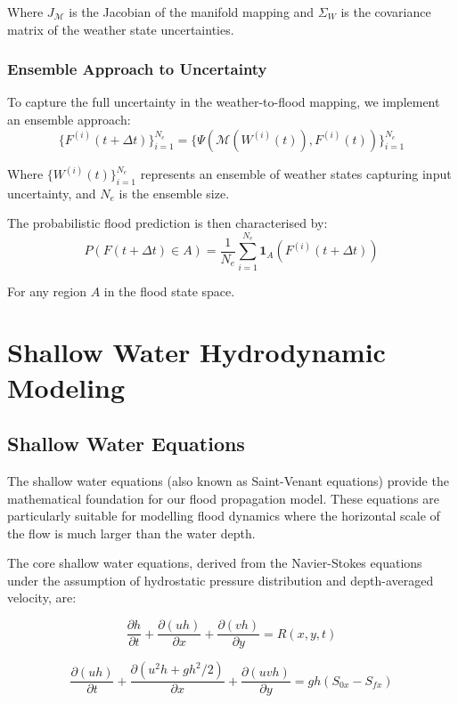 \documentclass{article}
\begin{document}
Where $J_{\mathcal{M}}$ is the Jacobian of the manifold mapping and $\Sigma_W$ is the covariance matrix of the weather state uncertainties.

\subsubsection{Ensemble Approach to Uncertainty}
To capture the full uncertainty in the weather-to-flood mapping, we implement an ensemble approach:
\begin{equation}
\{F^{(i)}(t+\Delta t)\}_{i=1}^{N_e} = \{\Psi(\mathcal{M}(W^{(i)}(t)), F^{(i)}(t))\}_{i=1}^{N_e}
\end{equation}

Where $\{W^{(i)}(t)\}_{i=1}^{N_e}$ represents an ensemble of weather states capturing input uncertainty, and $N_e$ is the ensemble size.

The probabilistic flood prediction is then characterised by:
\begin{equation}
P(F(t+\Delta t) \in A) = \frac{1}{N_e}\sum_{i=1}^{N_e} \mathbf{1}_{A}(F^{(i)}(t+\Delta t))
\end{equation}

For any region $A$ in the flood state space.

\section{Shallow Water Hydrodynamic Modeling}
\subsection{Shallow Water Equations}
The shallow water equations (also known as Saint-Venant equations) provide the mathematical foundation for our flood propagation model. These equations are particularly suitable for modelling flood dynamics where the horizontal scale of the flow is much larger than the water depth.

The core shallow water equations, derived from the Navier-Stokes equations under the assumption of hydrostatic pressure distribution and depth-averaged velocity, are:

\begin{equation}
\frac{\partial h}{\partial t} + \frac{\partial(uh)}{\partial x} + \frac{\partial(vh)}{\partial y} = R(x,y,t)
\end{equation}

\begin{equation}
\frac{\partial(uh)}{\partial t} + \frac{\partial(u^2h + gh^2/2)}{\partial x} + \frac{\partial(uvh)}{\partial y} = gh(S_{0x} - S_{fx})
\end{equation}
\end{document}
